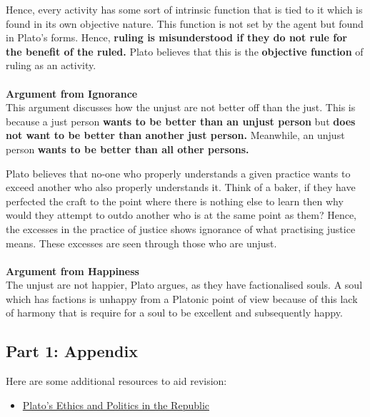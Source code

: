 \documentclass[12pt, letterpaper]{article}
\begin{document}
Hence, every activity has some sort of intrinsic function that is tied to it which is found in its own objective nature. This function is not set by the agent but found in Plato's forms. Hence, \textbf{ruling is misunderstood if they do not rule for the benefit of the ruled.} Plato believes that this is the \textbf{objective function} of ruling as an activity.\\\\
\textbf{Argument from Ignorance}\\
This argument discusses how the unjust are not better off than the just. This is because a just person \textbf{wants to be better than an unjust person} but \textbf{does not want to be better than another just person.} Meanwhile, an unjust person \textbf{wants to be better than all other persons.}

Plato believes that no-one who properly understands a given practice wants to exceed another who also properly understands it. Think of a baker, if they have perfected the craft to the point where there is nothing else to learn then why would they attempt to outdo another who is at the same point as them? Hence, the excesses in the practice of justice shows ignorance of what practising justice means. These excesses are seen through those who are unjust.\\\\
\textbf{Argument from Happiness}\\
The unjust are not happier, Plato argues, as they have factionalised souls. A soul which has factions is unhappy from a Platonic point of view because of this lack of harmony that is require for a soul to be excellent and subsequently happy.

\subsection{Part 1: Appendix}
Here are some additional resources to aid revision:
\begin{itemize}
	\item \href{https://plato.stanford.edu/entries/plato-ethics-politics/#PoliPartOneIdeaCons}{Plato's Ethics and Politics in the Republic}
\end{itemize}
\end{document}

